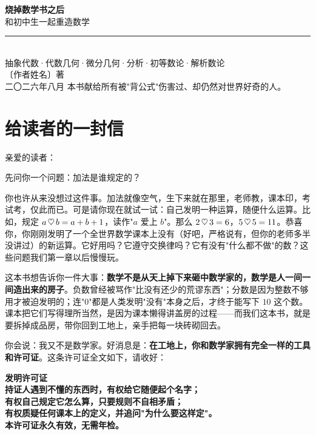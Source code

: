 \begin{titlepage}
\centering
\vspace*{2.5cm}
{\Huge\bfseries 烧掉数学书之后}\\[1.2em]
{\Large 和初中生一起重造数学}\\[2.2em]
{\color{shaohong}\rule{0.62\textwidth}{1.2pt}}\\[1.2em]
{\large 抽象代数\quad ·\quad 代数几何\quad ·\quad 微分几何\quad ·\quad 分析\quad ·\quad 初等数论\quad ·\quad 解析数论}\\[7em]
{\large 〔作者姓名〕\quad 著}\\[1.5em]
{\large 二〇二六年八月}
\vfill
{\small 本书献给所有被"背公式"伤害过、却仍然对世界好奇的人。}
\vspace*{1.5cm}
\end{titlepage}

\chapter*{给读者的一封信}

亲爱的读者：

先问你一个问题：加法是谁规定的？

你也许从来没想过这件事。加法就像空气，生下来就在那里，老师教，课本印，考试考，仅此而已。可是请你现在就试一试：自己发明一种运算，随便什么运算。比如，规定 $a \,\heartsuit\, b = a + b + 1$，读作"$a$ 爱上 $b$"。那么 $2 \,\heartsuit\, 3 = 6$，$5 \,\heartsuit\, 5 = 11$。恭喜你，你刚刚发明了一个全世界数学课本上没有（好吧，严格说有，但你的老师多半没讲过）的新运算。它好用吗？它遵守交换律吗？它有没有"什么都不做"的数？这些问题我们第一章以后慢慢玩。

这本书想告诉你一件大事：\textbf{数学不是从天上掉下来砸中数学家的，数学是人一间一间造出来的房子}。负数曾经被骂作"比没有还少的荒谬东西"；分数是因为整数不够用才被迫发明的；连"$0$"都是人类发明"没有"本身之后，才终于能写下 $10$ 这个数。课本把它们写得理所当然，是因为课本懒得讲盖房的过程——而我们这本书，就是要拆掉成品房，带你回到工地上，亲手把每一块砖砌回去。

你会说：我又不是数学家。好消息是：\textbf{在工地上，你和数学家拥有完全一样的工具和许可证}。这条许可证全文如下，请收好：

\begin{center}
\begin{tcolorbox}[colback=shaohong!5!white,colframe=shaohong!85!black,arc=3mm,width=0.92\textwidth]
\centering\bfseries 发明许可证\\[0.5em]
\normalfont 持证人遇到不懂的东西时，有权给它随便起个名字；\\
有权自己规定它怎么算，只要规则不自相矛盾；\\
有权质疑任何课本上的定义，并追问"为什么要这样定"。\\[0.5em]
本许可证永久有效，无需年检。
\end{tcolorbox}
\end{center}

